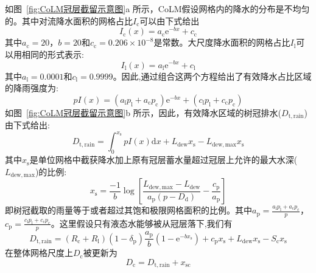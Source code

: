 如图~\ref{fig:CoLM冠层截留示意图}a 所示，CoLM假设网格内的降水的分布是不均匀的。其中对流降水面积的网格占比$I_{\mathrm {c}} $可以由下式给出
\begin{equation}
  I_{\mathrm{c}}(x)=a_{\mathrm{c}} {\mathrm e}^{-bx}+c_{\mathrm{c}}
\end{equation}
其中$a_{\mathrm {c}} =20$，$b=20$和$c_{\mathrm {c}} =0.206\times10^{-8}$是常数。大尺度降水面积的网格占比$I_{\mathrm {l}} $可以用相同的形式表示:
\begin{equation}
  I_{\mathrm{l}}(x)=a_{\mathrm{l}} {\mathrm e}^{-b x}+c_{\mathrm{l}}
\end{equation}
其中$a_{\mathrm {l}} =0.0001$和$c_{\mathrm {l}} =0.9999$。因此,通过组合这两个方程给出了有效降水占比区域的降雨强度为:
\begin{equation}
  p I(x)=\left(a_{\mathrm{l}} p_{\mathrm{l}}+a_{\mathrm{c}} p_{\mathrm{c}}\right) {\mathrm e}^{-b x}+\left(c_{\mathrm{l}} p_{\mathrm{l}}+c_{\mathrm{c}} p_{\mathrm{c}}\right)
\end{equation}
如图~\ref{fig:CoLM冠层截留示意图}b 所示，因此，有效降水区域的树冠排水($D_{\mathrm {t,rain}}$)由下式给出:
\begin{equation}
  D_{\mathrm {t,rain}}=\int_{0}^{x_{\mathrm{s}}} p I(x){\mathrm { d}} x+L_{\mathrm{dew}} x_{\mathrm{s}}-L_{\mathrm {dew,max}} x_{\mathrm{s}}
\end{equation}
其中$x_{\mathrm {s}} $是单位网格中截获降水加上原有冠层蓄水量超过冠层上允许的最大水深($L_{\mathrm {dew,max}}$)的比例:
\begin{equation}
  x_{\mathrm{s}}=\frac{-1}{b} \log \left[\frac{L_{\mathrm {dew,max}}-L_{\mathrm{dew}}}{a_{\mathrm{p}}\left(p-D_{\mathrm{d}}\right)}-\frac{c_{\mathrm{p}}}{a_{\mathrm{p}}}\right]
\end{equation}
即树冠截取的雨量等于或者超过其饱和极限网格面积的比例。其中$a_{\mathrm {p}} =\frac{a_{\mathrm {l}}p_{\mathrm {l}} +a_{\mathrm {c}}p_{\mathrm {c}} }{p}$，$c_{\mathrm {p}} =\frac{c_{\mathrm {l}}p_{\mathrm {l}} +c_{\mathrm {c}}p_{\mathrm {c}} }{p}$。这里假设只有液态水能够被从冠层落下,我们有
\begin{equation}
  D_{\mathrm {t,rain}}=\left(R_{\mathrm{c}}+R_{\mathrm{l}}\right)\left(1-\delta_{\mathrm{p}}\right) \frac{a_{\mathrm{p}}}{b}\left(1-{\mathrm e}^{-b x_{\mathrm{s}}}\right)+c_{\mathrm{p}} x_{\mathrm{s}}+L_{\mathrm{dew}} x_{\mathrm{s}}-S_{\mathrm{c}} x_{\mathrm{s}}
\end{equation}
在整体网格尺度上$D_{\mathrm {c}} $被更新为
\begin{equation}
  D_{\mathrm {c}} =D_{\mathrm {t,r a i n}}+x_{\mathrm{s c}}
\end{equation}
